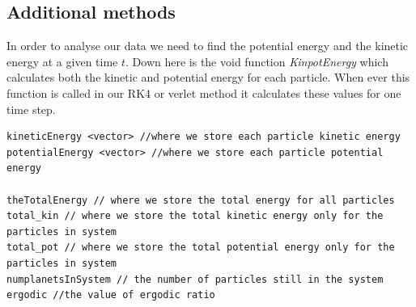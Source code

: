\documentclass[10pt,a4paper]{article}
\begin{document}
\subsection{Additional methods}
In order to analyse our data we need to find the potential energy and the kinetic energy at a given time $t$. Down here is the void function \emph{KinpotEnergy} which calculates both the kinetic and potential energy for each particle. When ever this function is called in our RK4 or verlet method it calculates these values for one time step.
\begin{lstlisting}
kineticEnergy <vector> //where we store each particle kinetic energy 
potentialEnergy <vector> //where we store each particle potential energy 

theTotalEnergy // where we store the total energy for all particles
total_kin // where we store the total kinetic energy only for the particles in system
total_pot // where we store the total potential energy only for the particles in system
numplanetsInSystem // the number of particles still in the system
ergodic //the value of ergodic ratio 
\end{lstlisting}
\end{document}
